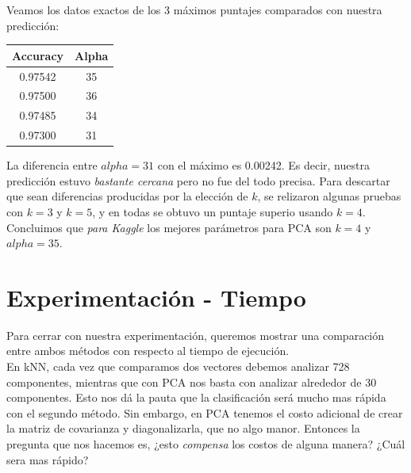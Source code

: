 Veamos los datos exactos de los 3 máximos puntajes comparados con nuestra predicción: \\

\begin{center}
    \begin{tabular}{| c | c |}
    \hline
     Accuracy    & Alpha  \\ \hline
     0.97542  & 35  \\ \hline
     0.97500  & 36  \\ \hline
     0.97485  & 34  \\ \hline
     0.97300  & 31  \\ \hline
    \end{tabular}
\end{center}

La diferencia entre $alpha=31$ con el máximo es 0.00242. Es decir, nuestra predicción estuvo \textit{bastante cercana} pero no fue del todo precisa. Para descartar que sean diferencias producidas por la elección de $k$, se relizaron algunas pruebas con $k=3$ y $k=5$, y en todas se obtuvo un puntaje superio usando $k=4$. Concluimos que \textit{para Kaggle} los mejores parámetros para PCA son $k=4$ y $alpha=35$.  \\

\newpage
\section{Experimentación - Tiempo}

Para cerrar con nuestra experimentación, queremos mostrar una comparación entre ambos métodos con respecto al tiempo de ejecución. \\

En kNN, cada vez que comparamos dos vectores debemos analizar 728 componentes, mientras que con PCA nos basta con analizar alrededor de 30 componentes. Esto nos dá la pauta que la clasificación será mucho mas rápida con el segundo método. Sin embargo, en PCA tenemos el costo adicional de crear la matriz de covarianza y diagonalizarla, que no algo manor. Entonces la pregunta que nos hacemos es, ¿esto \textit{compensa} los costos de alguna manera? ¿Cuál sera mas rápido? \\

